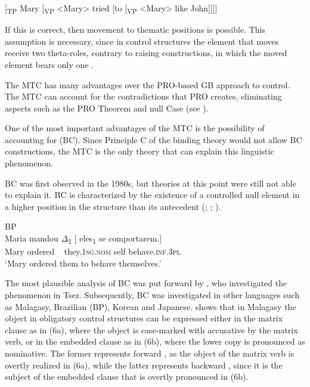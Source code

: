 \documentclass[output=paper]{langsci/langscibook}
\begin{document}
\ea%
\label{ex:moreno:4b}
[\textsubscript{TP} Mary [\textsubscript{VP} <Mary> tried [to [\textsubscript{VP} <Mary> like John]]]]
\z

If this is correct, then movement to thematic positions is possible. This assumption is necessary, since in control structures the element that moves receive two theta-roles, contrary to raising constructions, in which the moved element bears only one  \citep{Hornstein1999}.

The MTC has many advantages over the PRO-based GB approach to control. The MTC can account for the contradictions that PRO creates, eliminating aspects such as the PRO Theorem and null Case (see \citealt{Hornstein2001}). 

One of the most important advantages of the MTC is the possibility of accounting for  (BC). Since Principle C of the binding theory would not allow BC constructions, the MTC is the only theory that can explain this linguistic phenomenon. 

BC was first observed in the 1980s, but theories at this point were still not able to explain it. BC is characterized by the existence of a controlled null element in a higher position in the structure than its antecedent (\citealt{Farrell1995}; \citealt{Rodrigues2004}; \citealt{Boeckx2006}). 

\ea%
    BP\label{ex:moreno:3}\\
    \gll Maria mandou ${\Delta}$\textsubscript{1} [ eles\textsubscript{1} se comportarem.]  \\
         Mary ordered ~ {} they.\textsc{1sg.nom} self behave.\textsc{inf.3pl}\\
    \glt ‘Mary ordered them to behave themselves.’
    \z

The most plausible analysis of BC was put forward by \citet{Polinsky2002}, who investigated the phenomenon in Tsez. Subsequently, BC was investigated in other languages such as Malagasy, Brazilian  (BP), Korean and Japanese. \citet{Potsdam2009} shows that in Malagasy the object in obligatory control structures can be expressed either in the matrix clause as in (6a), where the object is case-marked with accusative by the matrix verb, or in the embedded clause as in (6b), where the lower copy is pronounced as nominative. The former represents forward , as the object of the matrix verb is overtly realized in (6a), while the latter represents backward , since it is the subject of the embedded clause that is overtly pronounced in (6b).
\end{document}
